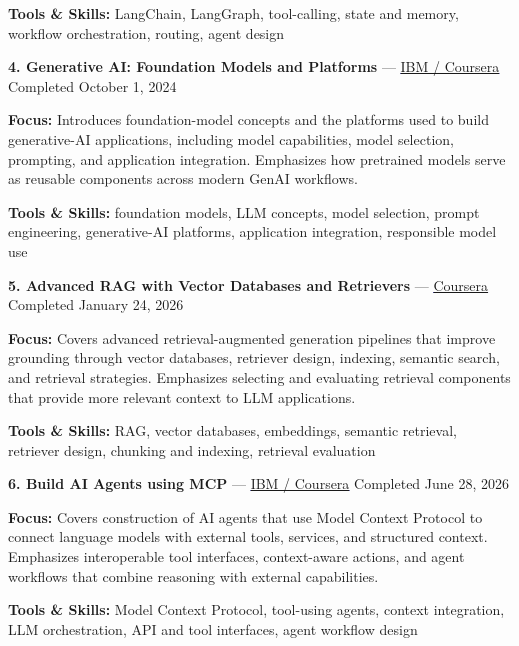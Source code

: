 \documentclass[9pt,letterpaper]{extarticle}
\begin{document}
{\small\textbf{Tools \& Skills:} LangChain, LangGraph, tool-calling, state and memory, workflow orchestration, routing, agent design\par}
\vspace{2pt}
\noindent\textbf{4. Generative AI: Foundation Models and Platforms} {\small --- \textcolor{blue}{\underline{\href{https://www.coursera.org/account/accomplishments/verify/AXQJZ5PZ3WH5}{IBM / Coursera}}} \textbar{} Completed \textbar{} October 1, 2024}\par
\textbf{Focus:} Introduces foundation-model concepts and the platforms used to build generative-AI applications, including model capabilities, model selection, prompting, and application integration. Emphasizes how pretrained models serve as reusable components across modern GenAI workflows.\par
{\small\textbf{Tools \& Skills:} foundation models, LLM concepts, model selection, prompt engineering, generative-AI platforms, application integration, responsible model use\par}
\vspace{2pt}
\noindent\textbf{5. Advanced RAG with Vector Databases and Retrievers} {\small --- \textcolor{blue}{\underline{\href{https://www.coursera.org/account/accomplishments/verify/AH57KRK80TBQ}{Coursera}}} \textbar{} Completed \textbar{} January 24, 2026}\par
\textbf{Focus:} Covers advanced retrieval-augmented generation pipelines that improve grounding through vector databases, retriever design, indexing, semantic search, and retrieval strategies. Emphasizes selecting and evaluating retrieval components that provide more relevant context to LLM applications.\par
{\small\textbf{Tools \& Skills:} RAG, vector databases, embeddings, semantic retrieval, retriever design, chunking and indexing, retrieval evaluation\par}
\vspace{2pt}
\noindent\textbf{6. Build AI Agents using MCP} {\small --- \textcolor{blue}{\underline{\href{https://www.coursera.org/account/accomplishments/verify/QWAQ3NL4TGSZ}{IBM / Coursera}}} \textbar{} Completed \textbar{} June 28, 2026}\par
\textbf{Focus:} Covers construction of AI agents that use Model Context Protocol to connect language models with external tools, services, and structured context. Emphasizes interoperable tool interfaces, context-aware actions, and agent workflows that combine reasoning with external capabilities.\par
{\small\textbf{Tools \& Skills:} Model Context Protocol, tool-using agents, context integration, LLM orchestration, API and tool interfaces, agent workflow design\par}
\vspace{2pt}
\end{document}
